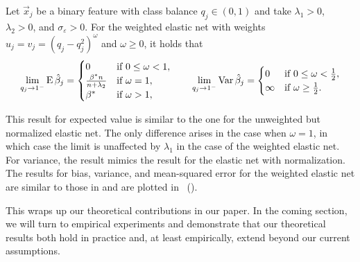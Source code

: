 \begin{theorem}
  \label{thm:weighted-elasticnet-bias-variance}
  Let \(\vec{x}_j\) be a binary feature with class balance \(q_j \in (0, 1)\) and take
  \(\lambda_1 > 0\), \(\lambda_2 > 0\), and \(\sigma_\varepsilon > 0\). For the
  weighted elastic net with weights \(u_j = v_j = (q_j-q_j^2)^\omega\) and \(\omega \geq 0\), it holds that
  \[
    \lim_{q_j \rightarrow 1^-} \operatorname{E} \hat{\beta}_j =
    \begin{cases}
      0                              & \text{if } 0 \leq \omega < 1, \\
      \frac{\beta^*n}{n + \lambda_2} & \text{if } \omega = 1,        \\
      \beta^*                        & \text{if } \omega > 1,
    \end{cases}
    \qquad
    \lim_{q_j \rightarrow 1^-} \operatorname{Var} \hat{\beta}_j =
    \begin{cases}
      0      & \text{if } 0 \leq \omega < \frac{1}{2}, \\
      \infty & \text{if } \omega \geq \frac{1}{2}.
    \end{cases}
  \]
\end{theorem}

This result for expected value is similar to the one for the unweighted but normalized
elastic net. The only difference arises in the case when \(\omega = 1\), in which case the
limit is unaffected by \(\lambda_1\) in the case of the weighted elastic net. For variance,
the result mimics the result for the elastic net with normalization. The results for bias,
variance, and mean-squared error for the weighted elastic net are similar to those in
 and are plotted in
~().

This wraps up our theoretical contributions in our paper. In the coming section, we will
turn to empirical experiments and demonstrate that our theoretical results both hold in
practice and, at least empirically, extend beyond our current assumptions.
